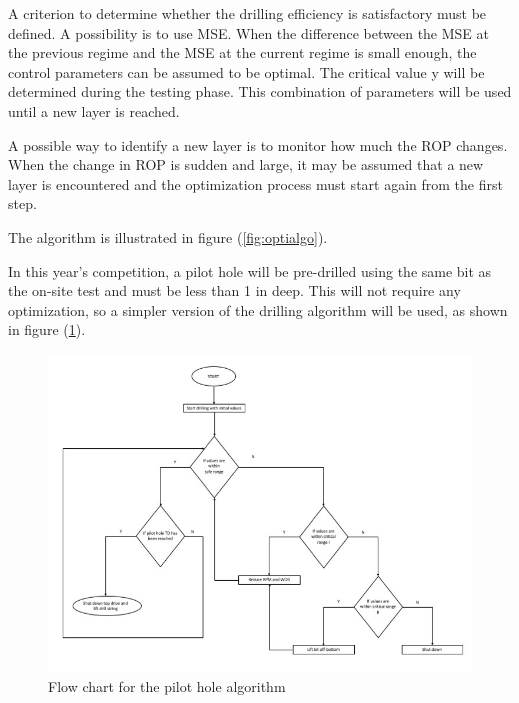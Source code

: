 A criterion to determine whether the drilling efficiency is satisfactory must be defined. A possibility is to use MSE. When the difference between the MSE at the previous regime and the MSE at the current regime is small enough, the control parameters can be assumed to be optimal. The critical value y will be determined during the testing phase. This combination of parameters will be used until a new layer is reached.

A possible way to identify a new layer is to monitor how much the ROP changes. When the change in ROP is sudden and large, it may be assumed that a new layer is encountered and the optimization process must start again from the first step.

The algorithm is illustrated in figure (\ref{fig:optialgo}).

In this year’s competition, a pilot hole will be pre-drilled using the same bit as the on-site test and must be less than 1 in deep. This will not require any optimization, so a simpler version of the drilling algorithm will be used, as shown in figure (\ref{fig:pilothole}).

\begin{figure} [H]
\centering
\includegraphics[width=1.0\textwidth]{figures/PilotHole.jpg}
\caption{Flow chart for the pilot hole algorithm}
\label{fig:pilothole}
\end{figure}










